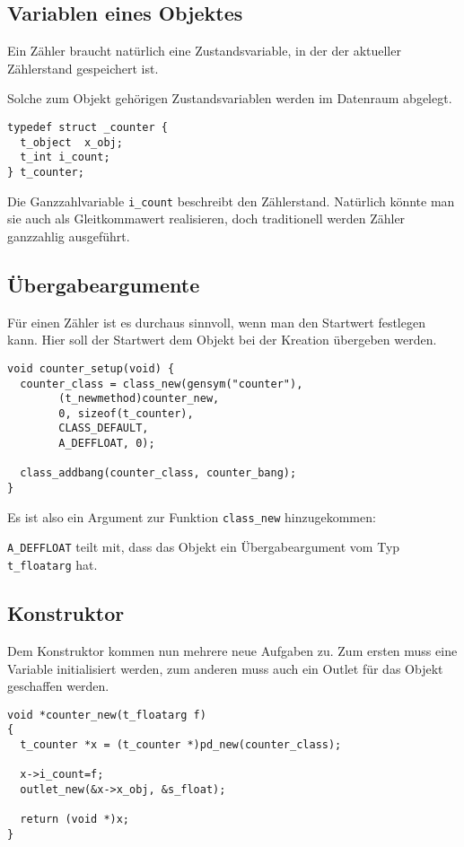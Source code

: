 \documentclass[12pt, a4paper,austrian, titlepage]{article}
\begin{document}
\subsection{Variablen eines Objektes}
Ein Zähler braucht natürlich eine Zustandsvariable,
in der der aktueller Zählerstand gespeichert ist.

Solche zum Objekt gehörigen Zustandsvariablen werden im Datenraum abgelegt.

\begin{verbatim}
typedef struct _counter {
  t_object  x_obj;
  t_int i_count;
} t_counter;
\end{verbatim}

Die Ganzzahlvariable \verb+i_count+ beschreibt den Zählerstand.
Natürlich könnte man sie auch als Gleitkommawert realisieren,
doch traditionell werden Zähler ganzzahlig ausgeführt.

\subsection{Übergabeargumente}
Für einen Zähler ist es durchaus sinnvoll, wenn man den Startwert festlegen kann.
Hier soll der Startwert dem Objekt bei der Kreation übergeben werden.

\begin{verbatim}
void counter_setup(void) {
  counter_class = class_new(gensym("counter"),
        (t_newmethod)counter_new,
        0, sizeof(t_counter),
        CLASS_DEFAULT,
        A_DEFFLOAT, 0);

  class_addbang(counter_class, counter_bang);
}
\end{verbatim}

Es ist also ein Argument zur Funktion \verb+class_new+ hinzugekommen:

\verb+A_DEFFLOAT+ teilt mit, dass das Objekt ein Übergabeargument
vom Typ \verb+t_floatarg+ hat.



\subsection{Konstruktor}
Dem Konstruktor kommen nun mehrere neue Aufgaben zu.
Zum ersten muss eine Variable initialisiert werden,
zum anderen muss auch ein Outlet für das Objekt geschaffen werden.
\begin{verbatim}
void *counter_new(t_floatarg f)
{
  t_counter *x = (t_counter *)pd_new(counter_class);

  x->i_count=f;
  outlet_new(&x->x_obj, &s_float);

  return (void *)x;
}
\end{verbatim}
\end{document}
